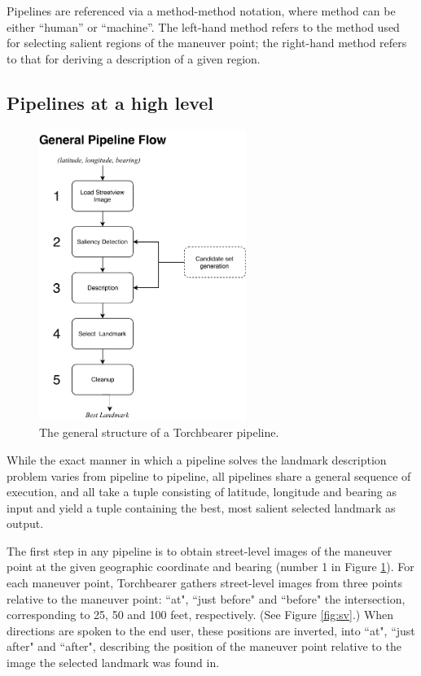 Pipelines are referenced via a method-method notation, where method can be either “human” or “machine”. The left-hand method refers to the method used for selecting salient regions of the maneuver point; the right-hand method refers to that for deriving a description of a given region.

\subsection{Pipelines at a high level}
	
\begin{figure}[htbp]
  \centering
  \includegraphics[width=0.6\textwidth]{pipeline_diagrams/general.pdf}
  \caption{The general structure of a Torchbearer pipeline.}
  \label{fig:pipeline:overview}
\end{figure}

While the exact manner in which a pipeline solves the landmark description problem varies from pipeline to pipeline, all pipelines share a general sequence of execution, and all take a tuple consisting of latitude, longitude and bearing as input and yield a tuple containing the best, most salient selected landmark as output.

The first step in any pipeline is to obtain street-level images of the maneuver point at the given geographic coordinate and bearing (number 1 in Figure \ref{fig:pipeline:overview}). For each maneuver point, Torchbearer gathers street-level images from three points relative to the maneuver point: ``at", ``just before" and ``before" the intersection, corresponding to 25, 50 and 100 feet, respectively. (See Figure \ref{fig:sv}.) When directions are spoken to the end user, these positions are inverted, into ``at", ``just after" and ``after", describing the position of the maneuver point relative to the image the selected landmark was found in.

